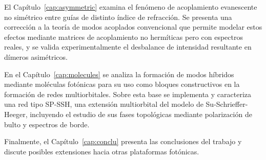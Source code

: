 El Capítulo~\ref{cap:asymmetric} examina el fenómeno de acoplamiento evanescente no simétrico entre guías de distinto índice de refracción. Se presenta una corrección a la teoría de modos acoplados convencional que permite modelar estos efectos mediante matrices de acoplamiento no hermíticas pero con espectros reales, y se valida experimentalmente el desbalance de intensidad resultante en dímeros asimétricos.

En el Capítulo~\ref{cap:molecules} se analiza la formación de modos híbridos mediante moléculas fotónicas para su uso como bloques constructivos en la formación de redes multiorbitales. Sobre esta base se implementa y caracteriza una red tipo SP-SSH, una extensión multiorbital del modelo de Su-Schrieffer-Heeger, incluyendo el estudio de sus fases topológicas mediante polarización de bulto y espectros de borde.

Finalmente, el Capítulo~\ref{cap:conclu} presenta las conclusiones del trabajo y discute posibles extensiones hacia otras plataformas fotónicas.
